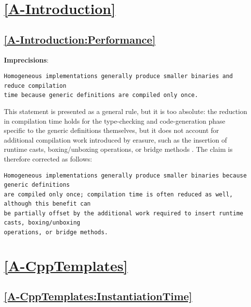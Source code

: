 \documentclass[11pt]{report}
\begin{document}
\section*{\hyperref[A-Introduction]{\ref*{A-Introduction} }}

\subsection*{\hyperref[A-Introduction:Performance]{\ref*{A-Introduction:Performance} }}
\noindent\textbf{Imprecisions}:
\begin{Verbatim}[breaklines=true]
Homogeneous implementations generally produce smaller binaries and reduce compilation
time because generic definitions are compiled only once.
\end{Verbatim}

This statement is presented as a general rule, but it is too absolute: the reduction in
compilation time holds for the type-checking and code-generation phase specific to the
generic definitions themselves, but it does not account for additional compilation work
introduced by erasure, such as the insertion of runtime casts, boxing/unboxing operations,
or bridge methods \cite{bracha2004}. The claim is therefore corrected as follows:

\begin{Verbatim}[breaklines=true]
Homogeneous implementations generally produce smaller binaries because generic definitions
are compiled only once; compilation time is often reduced as well, although this benefit can
be partially offset by the additional work required to insert runtime casts, boxing/unboxing
operations, or bridge methods.
\end{Verbatim}

\section*{\hyperref[A-CppTemplates]{\ref*{A-CppTemplates} }}

\subsection*{\hyperref[A-CppTemplates:InstantiationTime]{\ref*{A-CppTemplates:InstantiationTime} }}
\end{document}
